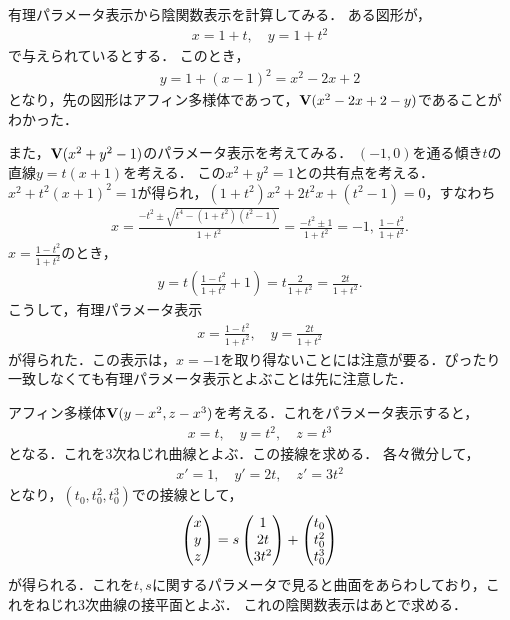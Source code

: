 \documentclass[9pt]{ltjsarticle}
\theoremstyle{break}
\theoremstyle{break}
\theoremstyle{break}
\theoremstyle{break}
\theoremstyle{break}
\theoremstyle{break}
\theoremstyle{break}
\theoremstyle{break}
\theoremstyle{break}
\theoremstyle{break}
\theoremstyle{break}
\theoremstyle{break}
\theoremstyle{break}
\theoremstyle{break}
\theoremstyle{break}
\theoremstyle{nonumberbreak}
\theoremstyle{nonumberbreak}
\begin{document}
有理パラメータ表示から陰関数表示を計算してみる．
ある図形が，
\begin{align}
 x=1+t,\quad y=1+t^2
\end{align}
で与えられているとする．
このとき，
\begin{align}
 y=1+(x-1)^2 = x^2 -2x +2
\end{align}
となり，先の図形はアフィン多様体であって，$\textbf V(x^2-2x+2-y)$であることがわかった．

また，$\textbf V(x^2+y^2-1)$のパラメータ表示を考えてみる．
$(-1,0)$を通る傾き$t$の直線$y=t(x+1)$を考える．
この$x^2+y^2=1$との共有点を考える．
$ x^2 + t^2(x+1)^2 = 1$が得られ，$(1+t^2)x^2 + 2t^2 x + (t^2-1)= 0$，すなわち
\begin{align}
 x= \frac{-t^2 \pm \sqrt{t^4 - (1+t^2)(t^2-1)}}{1+t^2}
=
\frac{-t^2 \pm 1}{1+t^2}
=
-1,\,\frac{1-t^2}{1+t^2}.
\end{align}
$x=\frac{1-t^2}{1+t^2}$のとき，
\begin{align}
 y=t(\frac{1-t^2}{1+t^2}+1)=
t\frac{2}{1+t^2}=
\frac{2t}{1+t^2}.
\end{align}
こうして，有理パラメータ表示
\begin{align}
 x=\frac{1-t^2}{1+t^2},\quad y=\frac{2t}{1+t^2}
\end{align}
が得られた．この表示は，$x=-1$を取り得ないことには注意が要る．ぴったり一致しなくても有理パラメータ表示とよぶことは先に注意した．

アフィン多様体$\textbf V(y-x^2,z-x^3)$を考える．これをパラメータ表示すると，
\begin{align}
 x = t,\quad y=t^2,\quad z=t^3
\end{align}
となる．これを3次ねじれ曲線とよぶ．この接線を求める．
各々微分して，
\begin{align}
 x' = 1,\quad y'= 2t,\quad z' = 3t^2
\end{align}
となり，$(t_0,t_0^2,t_0^3)$での接線として，
\begin{align}
 \left(\begin{matrix} x \\ y \\ z \end{matrix}\right) = s\left(\begin{matrix} 1 \\ 2t \\ 3t^2 \end{matrix}\right) + \left(\begin{matrix} t_0 \\ t_0^2 \\ t_0^3 \end{matrix}\right)
\end{align}
が得られる．これを$t,s$に関するパラメータで見ると曲面をあらわしており，これをねじれ3次曲線の接平面とよぶ．
これの陰関数表示はあとで求める．
\end{document}
